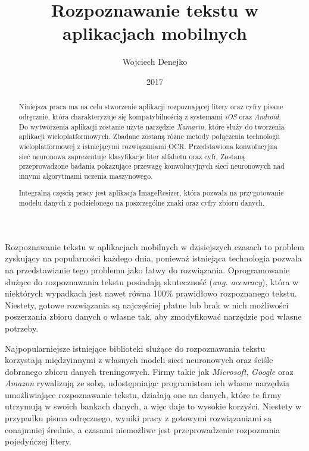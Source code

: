 \documentclass[brudnopis]{xmgr}
\author   {Wojciech Denejko}
\title    {Rozpoznawanie tekstu w aplikacjach mobilnych}
\date     {2017}
\begin{document}
\begin{abstract}
  Niniejsza praca ma na celu stworzenie aplikacji rozpoznającej litery oraz cyfry pisane odręcznie, która charakteryzuje się kompatybilnością z systemami \emph{iOS} oraz \emph{Android}. Do wytworzenia aplikacji zostanie użyte narzędzie \emph{Xamarin}, które służy do tworzenia aplikacji wieloplatformowych. Zbadane zostaną różne metody połączenia technologii wieloplatformowej z istniejącymi rozwiązaniami OCR. Przedstawiona konwolucyjna sieć neuronowa zaprezentuje klasyfikacje liter alfabetu oraz cyfr. Zostaną przeprowadzone badania pokazujące przewagę konwolucyjnych sieci neuronowych nad innymi algorytmami uczenia maszynowego.
  
  Integralną częścią pracy jest aplikacja ImageResizer, która pozwala na przygotowanie modelu danych z podzielonego na poszczególne znaki oraz cyfry zbioru danych.
  
\end{abstract}


\maketitle

\introduction
	Rozpoznawanie tekstu w aplikacjach mobilnych w dzisiejszych czasach to problem zyskujący na popularności każdego dnia, ponieważ istniejąca technologia pozwala na przedstawianie tego problemu jako łatwy do rozwiązania. Oprogramowanie służące do rozpoznawania tekstu posiadają skuteczność (\emph{ang. accuracy}), która w niektórych wypadkach jest nawet równa 100\% prawidłowo rozpoznanego tekstu. Niestety, gotowe rozwiązania są najczęściej płatne lub brak w nich możliwości poszerzania zbioru danych o własne tak, aby zmodyfikować narzędzie pod własne potrzeby.
	
	Najpopularniejsze istniejące biblioteki służące do rozpoznawania tekstu korzystają międzyinnymi z własnych modeli sieci neuronowych oraz ściśle dobranego zbioru danych treningowych. Firmy takie jak \emph{Microsoft}, \emph{Google} oraz \emph{Amazon} rywalizują ze sobą, udostępniając programistom ich własne narzędzia umożliwiające rozpoznawanie tekstu, działają one na danych, które te firmy utrzymują w swoich bankach danych, a więc daje to wysokie korzyści. Niestety w przypadku pisma odręcznego, wyniki pracy z gotowymi rozwiązaniami są conajmniej średnie, a czasami niemożliwe jest przeprowadzenie rozpoznania pojedyńczej litery.
	
\end{document}
